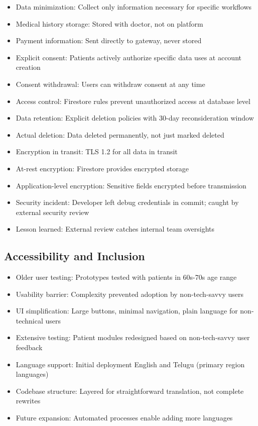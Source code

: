 \documentclass[12pt,a4paper]{report}
\begin{document}
\begin{itemize}
  \item Data minimization: Collect only information necessary for specific workflows
  \item Medical history storage: Stored with doctor, not on platform
  \item Payment information: Sent directly to gateway, never stored
  \item Explicit consent: Patients actively authorize specific data uses at account creation
  \item Consent withdrawal: Users can withdraw consent at any time
  \item Access control: Firestore rules prevent unauthorized access at database level
  \item Data retention: Explicit deletion policies with 30-day reconsideration window
  \item Actual deletion: Data deleted permanently, not just marked deleted
  \item Encryption in transit: TLS 1.2 for all data in transit
  \item At-rest encryption: Firestore provides encrypted storage
  \item Application-level encryption: Sensitive fields encrypted before transmission
  \item Security incident: Developer left debug credentials in commit; caught by external security review
  \item Lesson learned: External review catches internal team oversights
\end{itemize}

\subsection{Accessibility and Inclusion}

\begin{itemize}
  \item Older user testing: Prototypes tested with patients in 60s-70s age range
  \item Usability barrier: Complexity prevented adoption by non-tech-savvy users
  \item UI simplification: Large buttons, minimal navigation, plain language for non-technical users
  \item Extensive testing: Patient modules redesigned based on non-tech-savvy user feedback
  \item Language support: Initial deployment English and Telugu (primary region languages)
  \item Codebase structure: Layered for straightforward translation, not complete rewrites
  \item Future expansion: Automated processes enable adding more languages
\end{itemize}
\end{document}
